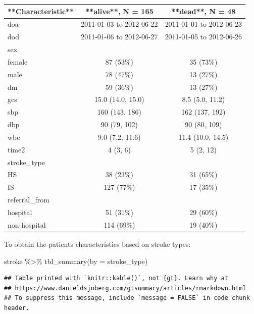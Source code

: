 \documentclass[
  10pt,
]{krantz}
\newenvironment{Shaded}{\begin{snugshade}}{\end{snugshade}}
\newcommand{\AttributeTok}[1]{\textcolor[rgb]{0.77,0.63,0.00}{#1}}
\newcommand{\FunctionTok}[1]{\textcolor[rgb]{0.00,0.00,0.00}{#1}}
\newcommand{\NormalTok}[1]{#1}
\newcommand{\SpecialCharTok}[1]{\textcolor[rgb]{0.00,0.00,0.00}{#1}}
\begin{document}
\begin{tabular}{l|c|c}
\hline
**Characteristic** & **alive**, N = 165 & **dead**, N = 48\\
\hline
doa & 2011-01-03 to 2012-06-22 & 2011-01-01 to 2012-06-23\\
\hline
dod & 2011-01-06 to 2012-06-27 & 2011-01-05 to 2012-06-26\\
\hline
sex &  & \\
\hline
female & 87 (53\%) & 35 (73\%)\\
\hline
male & 78 (47\%) & 13 (27\%)\\
\hline
dm & 59 (36\%) & 13 (27\%)\\
\hline
gcs & 15.0 (14.0, 15.0) & 8.5 (5.0, 11.2)\\
\hline
sbp & 160 (143, 186) & 162 (137, 192)\\
\hline
dbp & 90 (79, 102) & 90 (80, 109)\\
\hline
wbc & 9.0 (7.2, 11.6) & 11.4 (10.0, 14.5)\\
\hline
time2 & 4 (3, 6) & 5 (2, 12)\\
\hline
stroke\_type &  & \\
\hline
HS & 38 (23\%) & 31 (65\%)\\
\hline
IS & 127 (77\%) & 17 (35\%)\\
\hline
referral\_from &  & \\
\hline
hospital & 51 (31\%) & 29 (60\%)\\
\hline
non-hospital & 114 (69\%) & 19 (40\%)\\
\hline
\end{tabular}

To obtain the patients characteristics based on stroke types:

\begin{Shaded}
\begin{Highlighting}[]
\NormalTok{stroke }\SpecialCharTok{\%\textgreater{}\%} 
  \FunctionTok{tbl\_summary}\NormalTok{(}\AttributeTok{by =}\NormalTok{ stroke\_type)}
\end{Highlighting}
\end{Shaded}

\begin{verbatim}
## Table printed with `knitr::kable()`, not {gt}. Learn why at
## https://www.danieldsjoberg.com/gtsummary/articles/rmarkdown.html
## To suppress this message, include `message = FALSE` in code chunk header.
\end{verbatim}
\end{document}
